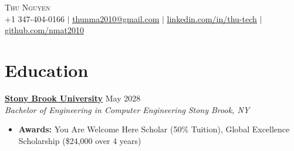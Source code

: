 \documentclass[letterpaper,10pt]{article}
\newcommand{\role}[4]{%
  \textbf{\underline{#1}} \hfill #2\\
  \textit{#3} \hfill \textit{#4}\vspace{-1pt}}
\begin{document}
\begin{center}
  {\Huge \scshape Thu Nguyen}\\[2pt]
  +1 347-404-0166 $|$ \href{mailto:thunma2010@gmail.com}{\underline{thunma2010@gmail.com}} $|$
  \href{https://linkedin.com/in/thu-tech}{\underline{linkedin.com/in/thu-tech}} $|$
  \href{https://github.com/nmat2010}{\underline{github.com/nmat2010}}
\end{center}

\section{Education}
\role{\href{https://www.stonybrook.edu}{Stony Brook University}}{May 2028}{Bachelor of Engineering in Computer Engineering}{Stony Brook, NY}
\begin{itemize}
  \item \textbf{Awards:} You Are Welcome Here Scholar (50\% Tuition), Global Excellence Scholarship (\$24,000 over 4 years)
\end{itemize}
\end{document}
